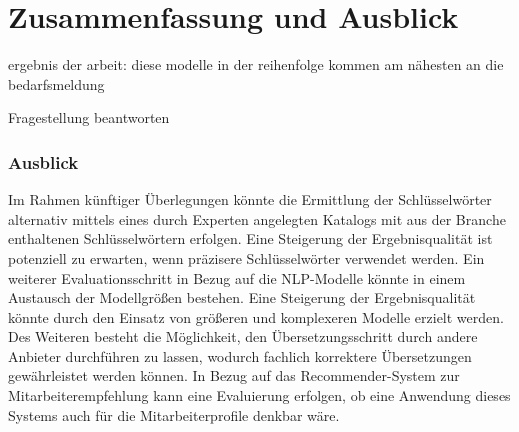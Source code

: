 \chapter{Zusammenfassung und Ausblick}
\label{chap:ergebnisseausblick}

ergebnis der arbeit: diese modelle in der reihenfolge kommen am nähesten an die bedarfsmeldung

Fragestellung beantworten



\subsection*{Ausblick}
Im Rahmen künftiger Überlegungen könnte die Ermittlung der Schlüsselwörter alternativ mittels eines durch Experten angelegten Katalogs mit aus der Branche enthaltenen Schlüsselwörtern erfolgen. Eine Steigerung der Ergebnisqualität ist potenziell zu erwarten, wenn präzisere Schlüsselwörter verwendet werden. Ein weiterer Evaluationsschritt in Bezug auf die NLP-Modelle könnte in einem Austausch der Modellgrößen bestehen. Eine Steigerung der Ergebnisqualität könnte durch den Einsatz von größeren und komplexeren Modelle erzielt werden. Des Weiteren besteht die Möglichkeit, den Übersetzungsschritt durch andere Anbieter durchführen zu lassen, wodurch fachlich korrektere Übersetzungen gewährleistet werden können. In Bezug auf das Recommender-System zur Mitarbeiterempfehlung kann eine Evaluierung erfolgen, ob eine Anwendung dieses Systems auch für die Mitarbeiterprofile denkbar wäre.
\newpage
